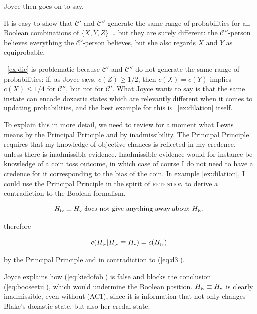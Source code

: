 \documentclass[phd,12pt,oneside]{ubcthesis}
\begin{document}
{\noindent}Joyce then goes on to say,

\begin{quotex}
  It is easy to show that $\mathcal{C}'$ and $\mathcal{C}''$ generate
  the same range of probabilities for all Boolean combinations of
  $\{X,Y,Z\}$ {\ldots} but they are surely different: the
  $\mathcal{C}''$-person believes everything the $\mathcal{C}'$-person
  believes, but she also regards $X$ and $Y$ as equiprobable.
\end{quotex}

{\noindent}{\Xample}~\ref{ex:die} is problematic because $\mathcal{C}'$ and
$\mathcal{C}''$ do not generate the same range of probabilities: if,
as Joyce says, $c(Z)\geq1/2$, then $c(X)=c(Y)$ implies $c(X)\leq{}1/4$
for $\mathcal{C}''$, but not for $\mathcal{C}'$. What Joyce wants to
say is that the same instate can encode doxastic states which are
relevantly different when it comes to updating probabilities, and the
best example for this is {\xample}~\ref{ex:dilation} itself.

To explain this in more detail, we need to review for a moment what
Lewis means by the Principal Principle and by inadmissibility. The
Principal Principle requires that my knowledge of objective chances is
reflected in my credence, unless there is inadmissible evidence.
Inadmissible evidence would for instance be knowledge of a coin toss
outcome, in which case of course I do not need to have a credence for
it corresponding to the bias of the coin. In example
\ref{ex:dilation}, I could use the Principal Principle in the spirit
of \textsc{retention} to derive a contradiction to the Boolean
formalism. 

\begin{equation}
  \label{eq:kiedofob}
H_{\mbox{\tiny{iv}}}\equiv{}H_{\mbox{\tiny{v}}}\mbox{ does not give anything away about }H_{\mbox{\tiny{iv}}}, 
\end{equation}

{\noindent}therefore

\begin{equation}
  \label{eq:booseetu}
c(H_{\mbox{\tiny{iv}}}|H_{\mbox{\tiny{iv}}}\equiv{}H_{\mbox{\tiny{v}}})=c(H_{\mbox{\tiny{iv}}})  
\end{equation}

{\noindent}by the Principal Principle and in contradiction to (\ref{eq:d3}).

Joyce explains how (\ref{eq:kiedofob}) is false and blocks the
conclusion (\ref{eq:booseetu}), which would undermine the Boolean
position. $H_{\mbox{\tiny{iv}}}\equiv{}H_{\mbox{\tiny{v}}}$ is clearly
inadmissible, even without (AC1), since it is information that not
only changes Blake's doxastic state, but also her credal
state.
\end{document}
